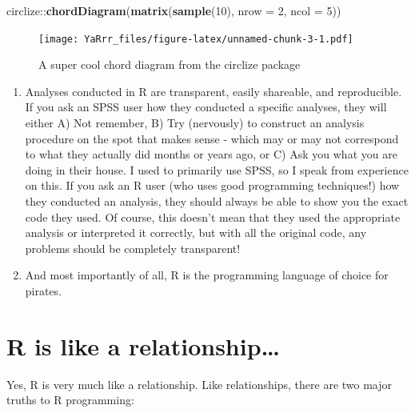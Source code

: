 \documentclass[]{book}
\newenvironment{Shaded}{\begin{snugshade}}{\end{snugshade}}
\newcommand{\KeywordTok}[1]{\textcolor[rgb]{0.13,0.29,0.53}{\textbf{{#1}}}}
\newcommand{\DataTypeTok}[1]{\textcolor[rgb]{0.13,0.29,0.53}{{#1}}}
\newcommand{\DecValTok}[1]{\textcolor[rgb]{0.00,0.00,0.81}{{#1}}}
\newcommand{\NormalTok}[1]{{#1}}
\begin{document}
\begin{Shaded}
\begin{Highlighting}[]
\NormalTok{circlize::}\KeywordTok{chordDiagram}\NormalTok{(}\KeywordTok{matrix}\NormalTok{(}\KeywordTok{sample}\NormalTok{(}\DecValTok{10}\NormalTok{), }
                              \DataTypeTok{nrow =} \DecValTok{2}\NormalTok{, }\DataTypeTok{ncol =} \DecValTok{5}\NormalTok{))}
\end{Highlighting}
\end{Shaded}

\begin{figure}[htbp]
\centering
\texttt{[image: YaRrr\_files/figure-latex/unnamed-chunk-3-1.pdf]}
\caption{\label{fig:unnamed-chunk-3}A super cool chord diagram from the
circlize package}
\end{figure}

\begin{enumerate}
\def\labelenumi{\arabic{enumi}.}
\setcounter{enumi}{4}
\item
  Analyses conducted in R are transparent, easily shareable, and
  reproducible. If you ask an SPSS user how they conducted a specific
  analyses, they will either A) Not remember, B) Try (nervously) to
  construct an analysis procedure on the spot that makes sense - which
  may or may not correspond to what they actually did months or years
  ago, or C) Ask you what you are doing in their house. I used to
  primarily use SPSS, so I speak from experience on this. If you ask an
  R user (who uses good programming techniques!) how they conducted an
  analysis, they should always be able to show you the exact code they
  used. Of course, this doesn't mean that they used the appropriate
  analysis or interpreted it correctly, but with all the original code,
  any problems should be completely transparent!
\item
  And most importantly of all, R is the programming language of choice
  for pirates.
\end{enumerate}

\section{R is like a
relationship\ldots{}}\label{r-is-like-a-relationship}

Yes, R is very much like a relationship. Like relationships, there are
two major truths to R programming:
\end{document}
